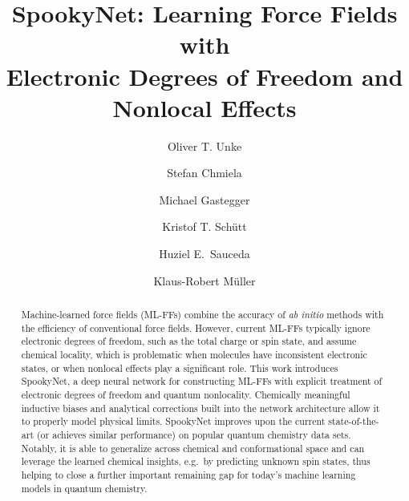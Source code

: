 \documentclass[%
superscriptaddress,
reprint,
nofootinbib,
amsmath,amssymb,amsfonts,
floatfix,
altaffilletter,
showkeys,
]{revtex4-2}
\newcommand{\nn}{SpookyNet}
\begin{document}
\title{\nn{}: Learning Force Fields with \\Electronic Degrees of Freedom and Nonlocal Effects}
\author{Oliver T. Unke}

\author{Stefan Chmiela}

\author{Michael Gastegger}

\author{Kristof T. Sch\"utt}

\author{Huziel E.\ Sauceda}

\author{Klaus-Robert M\"uller}



\begin{abstract}
Machine-learned force fields (ML-FFs) combine the accuracy of \textit{ab initio} methods with the efficiency of conventional force fields. However, current ML-FFs typically ignore electronic degrees of freedom, such as the total charge or spin state, and assume chemical locality, which is problematic when molecules have inconsistent electronic states, or when nonlocal effects play a significant role. This work introduces \nn{}, a deep neural network for constructing ML-FFs with explicit treatment of electronic degrees of freedom and quantum nonlocality. Chemically meaningful inductive biases and analytical corrections built into the network architecture allow it to properly model physical limits.
\nn{} improves upon the current state-of-the-art (or achieves similar performance) on popular quantum chemistry data sets. Notably, it is able to generalize across chemical and conformational space and can leverage the learned chemical insights, e.g.\ by predicting unknown spin states, thus helping to close a further important remaining gap for today's machine learning models in quantum chemistry.

\end{abstract}
\end{document}
